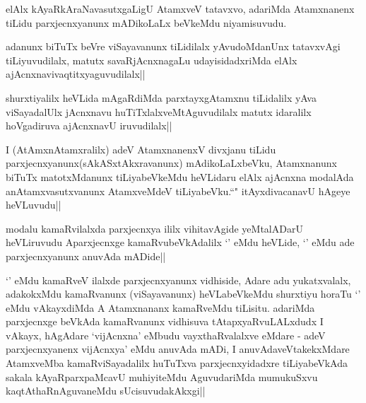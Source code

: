 
\begin{artha}
elAlx kAyaRkAraNavasutxgaLigU AtamxveV tatavxvo, adariMda Atamxnanenx tiLidu parxjecnxyanunx mADikoLaLx beVkeMdu niyamisuvudu.
\end{artha}

\begin{artha}
adanunx biTuTx beVre viSayavanunx tiLidilalx yAvudoMdanUnx tatavxvAgi tiLiyuvudilalx, matutx savaRjAcnxnagaLu udayisidadxriMda elAlx ajAcnxnavivaqtitxyaguvudilalx||
\end{artha}


\begin{artha}
shurxtiyalilx heVLida mAgaRdiMda parxtayxgAtamxnu tiLidalilx yAva viSayadalUlx jAcnxnavu huTiTxlalxveMtAguvudilalx matutx idaralilx hoVgadiruva ajAcnxnavU iruvudilalx||
\end{artha}


\begin{artha}
I (AtAmxnAtamxralilx) adeV AtamxnanenxV divxjanu tiLidu parxjecnxyanunx(sAkASxtAkxravanunx) mAdikoLaLxbeVku, Atamxnanunx biTuTx matotxMdanunx tiLiyabeVkeMdu heVLidaru elAlx ajAcnxna modalAda anAtamxvasutxvanunx AtamxveMdeV tiLiyabeVku.``\stext" itAyxdivacanavU hAgeye heVLuvudu||
\end{artha}


\begin{artha}
modalu kamaRvilalxda parxjecnxya ililx vihitavAgide yeMtalADarU heVLiruvudu Aparxjecnxge kamaRvubeVkAdalilx `\stext' eMdu heVLide, `\stext' eMdu ade parxjecnxyanunx anuvAda mADide||
\end{artha}


\begin{artha}
`\stext' eMdu kamaRveV ilalxde parxjecnxyanunx vidhiside, Adare adu yukatxvalalx, adakokxMdu kamaRvanunx (viSayavanunx) heVLabeVkeMdu shurxtiyu horaTu `\stext' eMdu vAkayxdiMda A Atamxnananx kamaRveMdu tiLisitu. adariMda parxjecnxge beVkAda kamaRvanunx vidhisuva tAtapxyaRvuLALxdudx I vAkayx, hAgAdare `vijAcnxna' eMbudu vayxthaRvalalxve eMdare - adeV parxjecnxyanenx vijAcnxya' eMdu anuvAda mADi, I anuvAdaveVtakekxMdare AtamxveMba kamaRviSayadalilx huTuTxva parxjecnxyidadxre tiLiyabeVkAda sakala kAyaRparxpaMcavU muhiyiteMdu AguvudariMda mumukuSxvu kaqtAthaRnAguvaneMdu sUcisuvudakAkxgi||
\end{artha}

